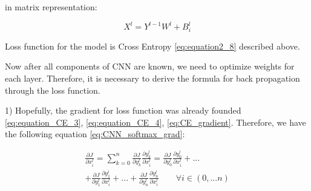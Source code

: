in matrix representation:

\begin{equation}
	X^l=Y^{l-1}W^l+B^l_i 
\end{equation}

\noindent Loss function for the model is Cross Entropy \ref{eq:equation2_8} described above.

Now after all components of CNN are known, we need to optimize weights for each layer. Therefore, it is necessary to derive the formula for back propagation through the loss function. 

1) Hopefully, the gradient for loss function was already founded \ref{eq:equation_CE_3}, \ref{eq:equation_CE_4}, \ref{eq:CE_gradient}.
Therefore, we have the following equation \ref{eq:CNN_softmax_grad}: 

\begin{equation}
	\label{eq:CNN_softmax_grad}
	\begin{multlined}
	 \frac{\partial J}{\partial x^l_i} = \sum_{k=0}^{n} \frac{\partial J}{\partial y^l_k} \frac {\partial y^l_k} {\partial x^l_i} = \frac{\partial J}{\partial y^l_0} \frac {\partial y^l_0} {\partial x^l_i} + ... \\ + \frac{\partial J}{\partial y^l_1} \frac {\partial y^l_1} {\partial x^l_i} + ...
	 + \frac{\partial J}{\partial y^l_n} \frac {\partial y^l_n} {\partial x^l_i} \qquad \forall i \in (0,...n)
	\end{multlined}
\end{equation}

